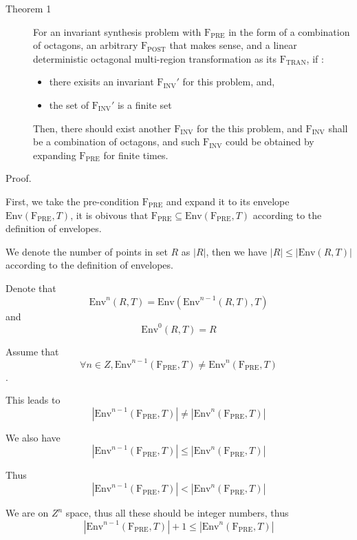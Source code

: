 \documentclass[letterpaper,]{article}
\providecommand{\tightlist}{%
  \setlength{\itemsep}{0pt}\setlength{\parskip}{0pt}}
\begin{document}
\begin{description}
\item[Theorem 1]
For an invariant synthesis problem with \(\mathrm{F_{PRE}}\) in the form
of a combination of octagons, an arbitrary \(\mathrm{F_{POST}}\) that
makes sense, and a linear deterministic octagonal multi-region
transformation as its \(\mathrm{F_{TRAN}}\), if :

\begin{itemize}
\tightlist
\item
  there exisits an invariant \(\mathrm{F_{INV}}'\) for this problem,
  and,
\item
  the set of \(\mathrm{F_{INV}}'\) is a finite set
\end{itemize}

Then, there should exist another \(\mathrm{F_{INV}}\) for the this
problem, and \(\mathrm{F_{INV}}\) shall be a combination of octagons,
and such \(\mathrm{F_{INV}}\) could be obtained by expanding
\(\mathrm{F_{PRE}}\) for finite times.
\end{description}

Proof.

First, we take the pre-condition \(\mathrm{F_{PRE}}\) and expand it to
its envelope \(\mathrm{Env}(\mathrm{F_{PRE}}, T)\), it is obivous that
\(\mathrm{F_{PRE}}\subseteq \mathrm{Env}(\mathrm{F_{PRE}}, T)\)
according to the definition of envelopes.

We denote the number of points in set \(R\) as \(|R|\), then we have
\(|R| \le |\mathrm{Env}(R, T)|\) according to the definition of
envelopes.

Denote that
\[\mathrm{Env}^n(R, T) = \mathrm{Env}(\mathrm{Env}^{n-1}(R, T), T)\] and
\[\mathrm{Env}^0(R, T) = R\]

Assume that
\[\forall n \in Z, \mathrm{Env}^{n-1}(\mathrm{F_{PRE}}, T) \neq \mathrm{Env}^{n}(\mathrm{F_{PRE}}, T) \].

This leads to
\[|\mathrm{Env}^{n-1}(\mathrm{F_{PRE}}, T)| \neq |\mathrm{Env}^{n}(\mathrm{F_{PRE}}, T)| \]

We also have
\[|\mathrm{Env}^{n-1}(\mathrm{F_{PRE}}, T)| \le |\mathrm{Env}^{n}(\mathrm{F_{PRE}}, T)|\]

Thus
\[  |\mathrm{Env}^{n-1}(\mathrm{F_{PRE}}, T)| < |\mathrm{Env}^{n}(\mathrm{F_{PRE}}, T)| \]

We are on \(Z^n\) space, thus all these should be integer numbers, thus
\[  |\mathrm{Env}^{n-1}(\mathrm{F_{PRE}}, T)| + 1 \le |\mathrm{Env}^{n}(\mathrm{F_{PRE}}, T)| \]
\end{document}
